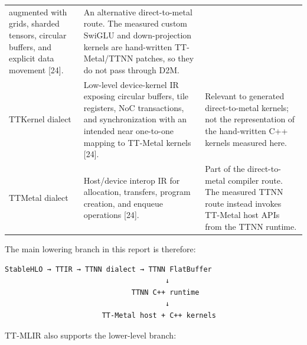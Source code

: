 \documentclass[
  10pt,
  american,
  10pt,
  letterpaper]{article}
\begin{document}
\begin{longtable}[]{@{}lll@{}}
\begin{minipage}[t]{0.30\columnwidth}
augmented with grids, sharded tensors, circular buffers, and explicit
data movement {[}24{]}.\strut
\end{minipage} & \begin{minipage}[t]{0.30\columnwidth}\raggedright
An alternative direct-to-metal route. The measured custom SwiGLU and
down-projection kernels are hand-written TT-Metal/TTNN patches, so they
do not pass through D2M.\strut
\end{minipage}\tabularnewline
\begin{minipage}[t]{0.30\columnwidth}\raggedright
TTKernel dialect\strut
\end{minipage} & \begin{minipage}[t]{0.30\columnwidth}\raggedright
Low-level device-kernel IR exposing circular buffers, tile registers,
NoC transactions, and synchronization with an intended near one-to-one
mapping to TT-Metal kernels {[}24{]}.\strut
\end{minipage} & \begin{minipage}[t]{0.30\columnwidth}\raggedright
Relevant to generated direct-to-metal kernels; not the representation of
the hand-written C++ kernels measured here.\strut
\end{minipage}\tabularnewline
\begin{minipage}[t]{0.30\columnwidth}\raggedright
TTMetal dialect\strut
\end{minipage} & \begin{minipage}[t]{0.30\columnwidth}\raggedright
Host/device interop IR for allocation, transfers, program creation, and
enqueue operations {[}24{]}.\strut
\end{minipage} & \begin{minipage}[t]{0.30\columnwidth}\raggedright
Part of the direct-to-metal compiler route. The measured TTNN route
instead invokes TT-Metal host APIs from the TTNN runtime.\strut
\end{minipage}\tabularnewline
\bottomrule
\end{longtable}

The main lowering branch in this report is therefore:

\begin{verbatim}
StableHLO → TTIR → TTNN dialect → TTNN FlatBuffer
                                      ↓
                              TTNN C++ runtime
                                      ↓
                       TT-Metal host + C++ kernels
\end{verbatim}

TT-MLIR also supports the lower-level branch:
\end{document}

